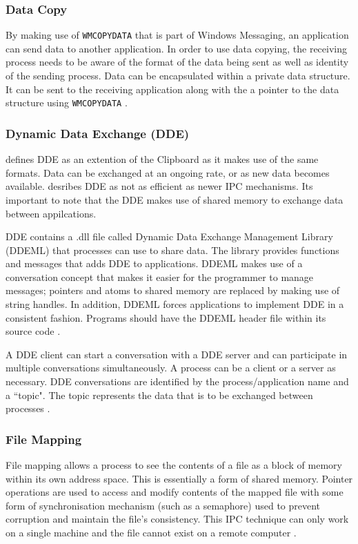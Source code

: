 \documentclass[12pt,a4paper,oneside]{article}
\def\code#1{\texttt{#1}}
\begin{document}
\begin{spacing}{1.4}
\subsubsection{Data Copy}
By making use of \code{WMCOPYDATA} that is part of Windows Messaging, an application can send data to another application. In order to use data copying, the receiving process needs to be aware of the format of the data being sent as well as identity of the sending process. Data can be encapsulated within a private data structure. It can be sent to the receiving application along with the a pointer to the data structure using \code{WMCOPYDATA} \citep{MSDN_API}.
\subsubsection{Dynamic Data Exchange (DDE)}
\cite{MSDN_API} defines DDE as an extention of the Clipboard as it makes use of the same formats. Data can be exchanged at an ongoing rate, or as new data becomes available. \cite{MSDN_API} desribes DDE as not as efficient as newer IPC mechanisms. Its important to note that the DDE makes use of shared memory to exchange data between appilcations.

DDE contains a .dll file called Dynamic Data Exchange Management Library (DDEML) that processes can use to share data. The library provides functions and messages that adds DDE to applications. DDEML makes use of a conversation concept that makes it easier for the programmer to manage messages; pointers and atoms to shared memory are replaced by making use of string handles. In addition, DDEML forces applications to implement DDE in a consistent fashion. Programs should have the DDEML header file within its source code \citep{MSDN_API}.

A DDE client can start a conversation with a DDE server and can participate in multiple conversations simultaneously. A process can be a client or a server as necessary. DDE conversations are identified by the process/application name and a ``topic". The topic represents the data that is to be exchanged between processes \citep{MSDN_API}.

\subsubsection{File Mapping}
File mapping allows a process to see the contents of a file as a block of memory within its own address space. This is essentially a form of shared memory. Pointer operations are used to access and modify contents of the mapped file with some form of synchronisation mechanism (such as a semaphore) used to prevent corruption and maintain the file's consistency. This IPC technique can only work on a single machine and the file cannot exist on a remote computer \citep{MSDN_API}.


\end{spacing}
\end{document}
